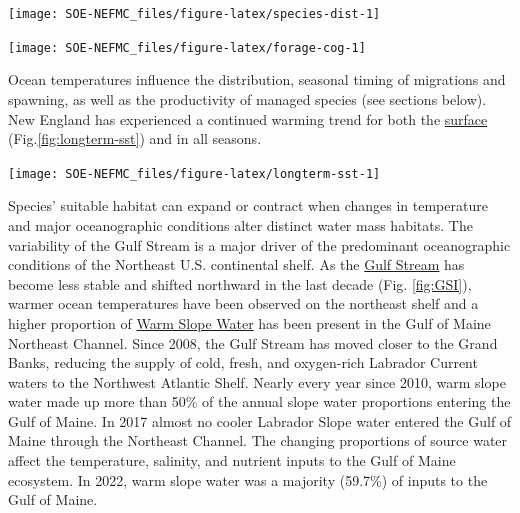 \documentclass[
  10pt,
]{article}
\let\origfigure\figure
\let\endorigfigure\endfigure
\renewenvironment{figure}[1][2] {
    \expandafter\origfigure\expandafter[H]
} {
    \endorigfigure
}
\begin{document}
\begin{figure}

{\centering \texttt{[image: SOE-NEFMC\_files/figure-latex/species-dist-1]} 

}

\caption{Aggregate species distribution metrics for species in the Northeast Large Marine Ecosystem.}\label{fig:species-dist}
\end{figure}
\begin{figure}

{\centering \texttt{[image: SOE-NEFMC\_files/figure-latex/forage-cog-1]} 

}

\caption{Eastward (left) and northward (right) shifts in the center of gravity for 20 forage fish species on the Northeast U.S. Shelf.}\label{fig:forage-cog}
\end{figure}

Ocean temperatures influence the distribution, seasonal timing of migrations and spawning, as well as the productivity of managed species (see sections below). New England has experienced a continued warming trend for both the \href{https://noaa-edab.github.io/catalog/seasonal_oisst_anom.html}{surface} (Fig.\ref{fig:longterm-sst}) and in all seasons.

\begin{figure}

{\centering \texttt{[image: SOE-NEFMC\_files/figure-latex/longterm-sst-1]} 

}

\caption{Mean sea surface temperature across the entire Mid-Atlantic shelf.}\label{fig:longterm-sst}
\end{figure}

Species' suitable habitat can expand or contract when changes in temperature and major oceanographic conditions alter distinct water mass habitats. The variability of the Gulf Stream is a major driver of the predominant oceanographic conditions of the Northeast U.S. continental shelf. As the \href{https://noaa-edab.github.io/catalog/gsi.html}{Gulf Stream} has become less stable and shifted northward in the last decade (Fig. \ref{fig:GSI}), warmer ocean temperatures have been observed on the northeast shelf and a higher proportion of \href{https://noaa-edab.github.io/catalog/slopewater.html}{Warm Slope Water} has been present in the Gulf of Maine Northeast Channel. Since 2008, the Gulf Stream has moved closer to the Grand Banks, reducing the supply of cold, fresh, and oxygen-rich Labrador Current waters to the Northwest Atlantic Shelf. Nearly every year since 2010, warm slope water made up more than 50\% of the annual slope water proportions entering the Gulf of Maine. In 2017 almost no cooler Labrador Slope water entered the Gulf of Maine through the Northeast Channel. The changing proportions of source water affect the temperature, salinity, and nutrient inputs to the Gulf of Maine ecosystem. In 2022, warm slope water was a majority (59.7\%) of inputs to the Gulf of Maine.
\end{document}
